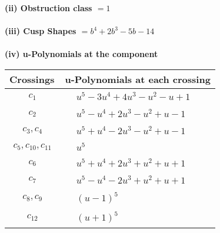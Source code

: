 \documentclass[1p]{elsarticle_modified}
\theoremstyle{definition}
\begin{document}
\flushleft \textbf{(ii) Obstruction class $= 1$}\\~\\
\flushleft \textbf{(iii) Cusp Shapes $= b^4+2 b^3-5 b-14$}\\~\\
\newpage\renewcommand{\arraystretch}{1}
\flushleft \textbf{(iv) u-Polynomials at the component}\newline \\
\begin{tabular}{m{50pt}|m{274pt}}
Crossings & \hspace{64pt}u-Polynomials at each crossing \\
\hline $$\begin{aligned}c_{1}\end{aligned}$$&$\begin{aligned}
&u^5-3 u^4+4 u^3- u^2- u+1
\end{aligned}$\\
\hline $$\begin{aligned}c_{2}\end{aligned}$$&$\begin{aligned}
&u^5- u^4+2 u^3- u^2+u-1
\end{aligned}$\\
\hline $$\begin{aligned}c_{3},c_{4}\end{aligned}$$&$\begin{aligned}
&u^5+u^4-2 u^3- u^2+u-1
\end{aligned}$\\
\hline $$\begin{aligned}c_{5},c_{10},c_{11}\end{aligned}$$&$\begin{aligned}
&u^5
\end{aligned}$\\
\hline $$\begin{aligned}c_{6}\end{aligned}$$&$\begin{aligned}
&u^5+u^4+2 u^3+u^2+u+1
\end{aligned}$\\
\hline $$\begin{aligned}c_{7}\end{aligned}$$&$\begin{aligned}
&u^5- u^4-2 u^3+u^2+u+1
\end{aligned}$\\
\hline $$\begin{aligned}c_{8},c_{9}\end{aligned}$$&$\begin{aligned}
&(u-1)^5
\end{aligned}$\\
\hline $$\begin{aligned}c_{12}\end{aligned}$$&$\begin{aligned}
&(u+1)^5
\end{aligned}$\\
\hline
\end{tabular}\\~\\
\end{document}
